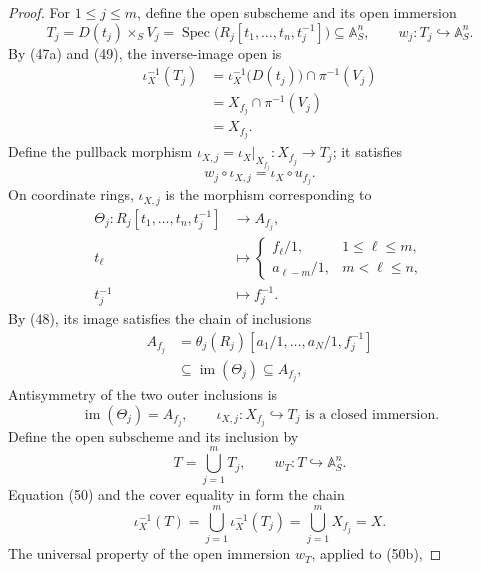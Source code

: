 \begin{proof}
  For $1\leq j\leq m$, define the open subscheme and its open immersion
  \[
    T_j=D(t_j)\times_SV_j
      =\operatorname{Spec}
        \bigl(R_j[t_1,\ldots,t_n,t_j^{-1}]\bigr)
      \subseteq\mathbb A^n_S,
    \qquad
    w_j\colon T_j\hookrightarrow\mathbb A^n_S.
  \]
  By (47a) and (49), the inverse-image open is
  \[
  \begin{aligned}
    \iota_X^{-1}(T_j)
      &=\iota_X^{-1}\bigl(D(t_j)\bigr)\cap\pi^{-1}(V_j)\\
      &=X_{f_j}\cap\pi^{-1}(V_j)\\
      &=X_{f_j}.
  \end{aligned}                                                   \tag{50}
  \]
  Define the pullback morphism
  $\iota_{X,j}=\iota_X|_{X_{f_j}}\colon X_{f_j}\to T_j$; it satisfies
  \[
    w_j\circ\iota_{X,j}=\iota_X\circ u_{f_j}.
  \]
  On coordinate rings, $\iota_{X,j}$ is the morphism corresponding to
  \[
  \begin{aligned}
    \Theta_j\colon
      R_j[t_1,\ldots,t_n,t_j^{-1}]
        &\longrightarrow A_{f_j},\\
    t_\ell&\longmapsto
      \begin{cases}
        f_\ell/1,&1\leq\ell\leq m,\\
        a_{\ell-m}/1,&m<\ell\leq n,
      \end{cases}\\
    t_j^{-1}&\longmapsto f_j^{-1}.
  \end{aligned}
  \]
  By (48), its image satisfies the chain of inclusions
  \[
  \begin{aligned}
    A_{f_j}
      &=\theta_j(R_j)
        [a_1/1,\ldots,a_N/1,f_j^{-1}]\\
      &\subseteq\operatorname{im}(\Theta_j)
       \subseteq A_{f_j},
  \end{aligned}
  \]
  Antisymmetry of the two outer inclusions is
  \[
    \operatorname{im}(\Theta_j)=A_{f_j},\qquad
    \iota_{X,j}\colon X_{f_j}\hookrightarrow T_j
      \text{ is a closed immersion}.                             \tag{50a}
  \]
  Define the open subscheme and its inclusion by
  \[
    T=\bigcup_{j=1}^mT_j,
    \qquad w_T\colon T\hookrightarrow\mathbb A^n_S.
  \]
  Equation (50) and the cover equality in
   form the chain
  \[
    \iota_X^{-1}(T)
      =\bigcup_{j=1}^m\iota_X^{-1}(T_j)
      =\bigcup_{j=1}^mX_{f_j}
      =X.                                                         \tag{50b}
  \]
  The universal property of the open immersion $w_T$, applied to (50b),

\end{proof}
